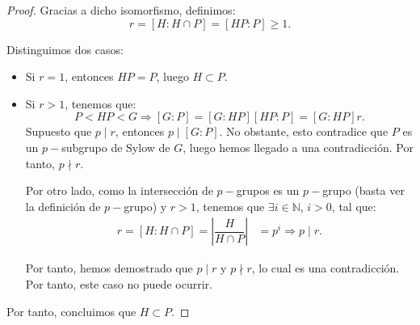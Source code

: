\begin{ejercicio}
\begin{lema}
\begin{proof}
            Gracias a dicho isomorfismo, definimos:
            \begin{equation*}
                r = [H: H\cap P] = [HP: P]\geq 1.
            \end{equation*}

            Distinguimos dos casos:
            \begin{itemize}
                \item Si \(r = 1\), entonces \(HP=P\), luego \(H\subset P\).
                \item Si \(r>1\), tenemos que:
                \begin{equation*}
                    P<HP< G
                    \Longrightarrow [G: P] = [G: HP][HP: P]=[G: HP]r.
                \end{equation*}
                Supuesto que $p\mid r$, entonces $p\mid [G: P]$. No obstante, esto contradice que \(P\) es un \(p-\)subgrupo de Sylow de \(G\), luego hemos llegado a una contradicción. Por tanto, $p\nmid r$.

                Por otro lado, como la intersección de \(p-\)grupos es un \(p-\)grupo (basta ver la definición de \(p-\)grupo) y $r>1$, tenemos que $\exists i\in \mathbb{N}$, \(i>0\), tal que:
                \begin{align*}
                    r = [H:H\cap P] = \left|\dfrac{H}{H\cap P}\right| &= p^i\Longrightarrow p\mid r.
                \end{align*}

                Por tanto, hemos demostrado que \(p\mid r\) y \(p\nmid r\), lo cual es una contradicción. Por tanto, este caso no puede ocurrir.
            \end{itemize}

            Por tanto, concluimos que \(H\subset P\).
        \end{proof}
    \end{lema}


\end{ejercicio}
